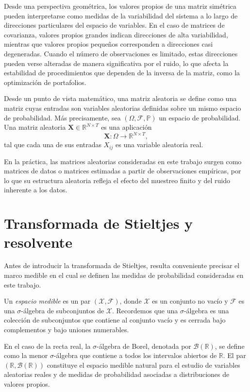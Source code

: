 \documentclass[letterpaper,12pt,oneside]{book}
\begin{document}
Desde una perspectiva geométrica, los valores propios de una matriz simétrica pueden interpretarse como medidas de la variabilidad del sistema a lo largo de direcciones particulares del espacio de variables. En el caso de matrices de covarianza, valores propios grandes indican direcciones de alta variabilidad, mientras que valores propios pequeños corresponden a direcciones casi degeneradas. Cuando el número de observaciones es limitado, estas direcciones pueden verse alteradas de manera significativa por el ruido, lo que afecta la estabilidad de procedimientos que dependen de la inversa de la matriz, como la optimización de portafolios.

Desde un punto de vista matemático, una matriz aleatoria se define como una matriz cuyas entradas son variables aleatorias definidas sobre un mismo espacio de probabilidad. Más precisamente, sea
$(\Omega, \mathcal{F}, \mathbb{P})$ un espacio de probabilidad. Una matriz aleatoria $\mathbf{X} \in
\mathbb{R}^{N \times T}$ es una aplicación
\[
\mathbf{X} : \Omega \to \mathbb{R}^{N \times T},
\]
tal que cada una de sus entradas $X_{ij}$ es una variable aleatoria real.

En la práctica, las matrices aleatorias consideradas en este trabajo surgen como matrices de datos o matrices estimadas a partir de observaciones empíricas, por lo que su estructura aleatoria refleja
el efecto del muestreo finito y del ruido inherente a los datos.

\section{Transformada de Stieltjes y resolvente}

Antes de introducir la transformada de Stieltjes, resulta conveniente precisar el marco medible en el cual se definen las medidas de probabilidad consideradas en este trabajo.

Un \emph{espacio medible} es un par $(\mathcal{X}, \mathcal{F})$, donde $\mathcal{X}$ es un conjunto no vacío y $\mathcal{F}$ es una $\sigma$-álgebra de subconjuntos de $\mathcal{X}$. Recordemos que una $\sigma$-álgebra es una colección de subconjuntos que contiene al conjunto vacío y es cerrada bajo complementos y bajo uniones numerables.

En el caso de la recta real, la $\sigma$-álgebra de Borel, denotada por $\mathcal{B}(\mathbb{R})$, se define como la menor $\sigma$-álgebra que contiene a todos los intervalos abiertos de $\mathbb{R}$.
El par $(\mathbb{R}, \mathcal{B}(\mathbb{R}))$ constituye el espacio medible natural para el estudio de variables aleatorias reales y de medidas de probabilidad asociadas a distribuciones de valores propios.
\end{document}
